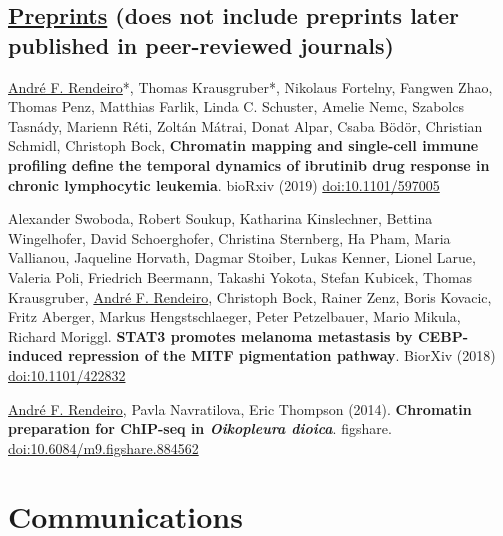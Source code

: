 \documentclass[11pt,a4paper,roman]{moderncv} %
\begin{document}
    \subsection{\underline{Preprints} (does not include preprints later published in peer-reviewed journals)}
        \begin{etaremune}[leftmargin=2.5cm,itemindent=0pt,topsep=10pt,itemsep=2pt,partopsep=0pt,parsep=0pt]
        \item \underline{André F. Rendeiro}*, Thomas Krausgruber*, Nikolaus Fortelny, Fangwen Zhao, Thomas Penz, Matthias Farlik, Linda C. Schuster, Amelie Nemc, Szabolcs Tasnády, Marienn Réti, Zoltán Mátrai, Donat Alpar, Csaba Bödör, Christian Schmidl, Christoph Bock, \textbf{Chromatin mapping and single-cell immune profiling define the temporal dynamics of ibrutinib drug response in chronic lymphocytic leukemia}. bioRxiv (2019) \href{https://dx.doi.org/10.1101/597005}{doi:10.1101/597005}
        \item Alexander Swoboda, Robert Soukup, Katharina Kinslechner, Bettina Wingelhofer, David Schoerghofer, Christina Sternberg, Ha Pham, Maria Vallianou, Jaqueline Horvath, Dagmar Stoiber, Lukas Kenner, Lionel Larue, Valeria Poli, Friedrich Beermann, Takashi Yokota, Stefan Kubicek, Thomas Krausgruber, \underline{André F. Rendeiro}, Christoph Bock, Rainer Zenz, Boris Kovacic, Fritz Aberger, Markus Hengstschlaeger, Peter Petzelbauer, Mario Mikula, Richard Moriggl. \textbf{STAT3 promotes melanoma metastasis by CEBP-induced repression of the MITF pigmentation pathway}. BiorXiv (2018) \href{https://dx.doi.org/ 10.1101/422832}{doi:10.1101/422832}
        \item \underline{André F. Rendeiro}, Pavla  Navratilova, Eric Thompson (2014). \textbf{Chromatin preparation for ChIP-seq in \textit{Oikopleura dioica}}. figshare. \href{http://dx.doi.org/10.6084/m9.figshare.884562}{doi:10.6084/m9.figshare.884562}
        \end{etaremune}

\section{Communications}
\end{document}

